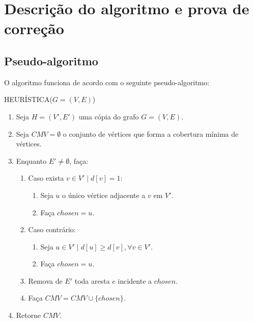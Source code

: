 \section{Descrição do algoritmo e prova de correção}
\label{sec:descricao-algoritmo}

\subsection{Pseudo-algoritmo}
O algoritmo funciona de acordo com o seguinte pseudo-algoritmo:

HEURÍSTICA($G = (V, E)$)
\begin{enumerate}
    \item Seja $H = (V', E')$ uma cópia do grafo $G= (V, E)$.
    \item Seja $CMV = \emptyset$ o conjunto de vértices que forma a
    cobertura mínima de vértices.
    \item Enquanto $E' \ne \emptyset$, faça:
    \label{item:loop}

    \begin{enumerate}
        \item Caso exista $v \in V' \mid d[v] = 1$:
        \label{item:alone}

        \begin{enumerate}
            \item Seja $u$ o único vértice adjacente a $v$ em $V'$.
            \label{item:find}

            \item Faça $chosen = u$.
        \end{enumerate}
        \item Caso contrário:
        \begin{enumerate}
            \item Seja $u \in V' \mid d[u] \ge d[v], \forall v \in
            V'$.
            \label{item:max}

            \item Faça $chosen = u$.
        \end{enumerate}
        \item Remova de $E'$ toda aresta $e$ incidente a $chosen$.
        \label{item:remove}

        \item Faça $CMV = CMV \cup \{chosen\}$.
    \end{enumerate}
    \item Retorne $CMV$.
\end{enumerate}

